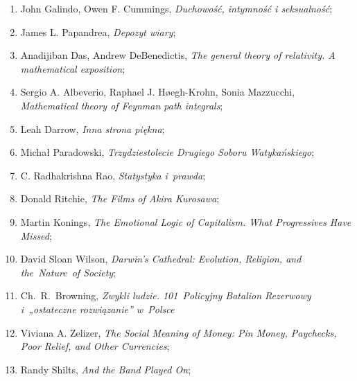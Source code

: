 \documentclass[a4paper,11pt]{article}
\begin{document}
\begin{enumerate}
\item John Galindo, Owen F. Cummings, \textit{Duchowość, intymność i
    seksualność};



\item James L. Papandrea, \textit{Depozyt wiary};



\item Anadijiban Das, Andrew DeBenedictis, \textit{The general theory of
    relativity. A mathematical exposition};



\item Sergio A. Albeverio, Raphael J. H\o egh-Krohn, Sonia Mazzucchi,
  \textit{Mathematical theory of Feynman path integrals};



\item Leah Darrow, \textit{Inna strona piękna};



\item Michał Paradowski, \textit{Trzydziestolecie Drugiego Soboru
    Watykańskiego};



\item C. Radhakrishna Rao, \textit{Statystyka i~prawda};



\item Donald Ritchie, \textit{The Films of Akira Kurosawa};



\item Martin Konings, \textit{The Emotional Logic of Capitalism. What
    Progressives Have Missed};



\item David Sloan Wilson, \textit{Darwin's Cathedral: Evolution,
    Religion, and the~Nature~of Society};



\item Ch.~R.~Browning, \textit{Zwykli ludzie. 101~Policyjny Batalion
    Rezerwowy i~„ostateczne rozwiązanie” w~Polsce}



\item Viviana A. Zelizer, \textit{The Social Meaning of Money: Pin
    Money, Paychecks, Poor Relief, and Other Currencies};



\item Randy Shilts, \textit{And the Band Played On};




\end{enumerate}
\end{document}
